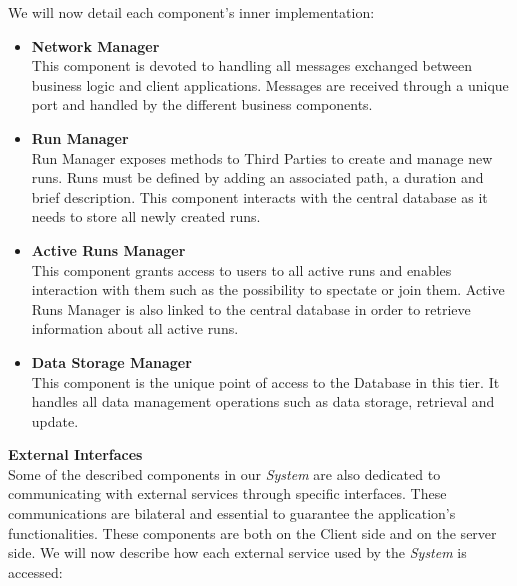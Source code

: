 \documentclass[titlepage]{article}
\begin{document}
We will now detail each component’s inner implementation:
\begin{itemize}
        \item {\bf Network Manager }\\
        This component is devoted to handling all messages exchanged between business logic and client applications. Messages are received through a unique port and handled by the different business components.
		\item {\bf Run Manager }\\
		Run Manager exposes methods to Third Parties  to create and manage new runs. Runs must be defined by adding an associated path, a duration and brief description. This component interacts with the central database as it needs to store all newly created runs.
		\item {\bf Active Runs Manager }\\
		This component grants access to users to all active runs and enables interaction with them such as the possibility to spectate or join them. Active Runs Manager is also linked to the central database in order to retrieve information about all active runs.
		\item {\bf Data Storage Manager }\\
		This component is the unique point of access to the Database in this tier. It handles all data management operations such as data storage, retrieval and update.\\
    \end{itemize}
{\bf External Interfaces }\\ 
Some of the described components in our {\it System} are also dedicated to communicating with external services through specific interfaces. These communications are bilateral and essential to guarantee the application’s functionalities. These components are both on the Client side and on the server side. We will now describe how each external service used by the {\it System} is accessed:
\end{document}
